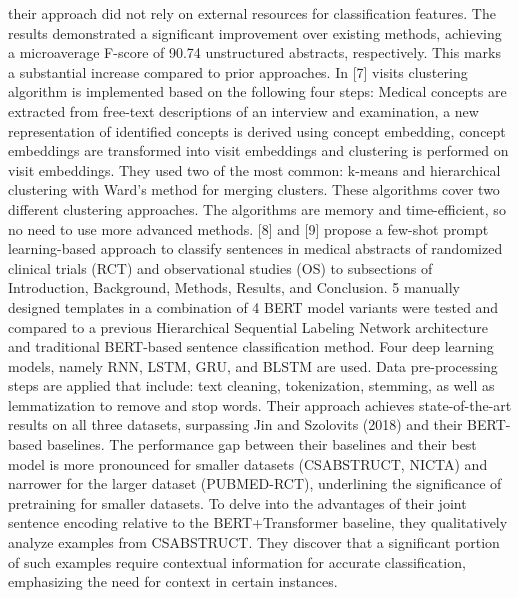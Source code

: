 \documentclass[conference]{IEEEtran}
\begin{document}
their approach did not rely on external resources
for classification features. The results demonstrated a significant
improvement over existing methods, achieving a microaverage
F-score of 90.74%
unstructured abstracts, respectively. This marks a substantial
increase compared to prior approaches.
In [7] visits clustering algorithm is implemented based on
the following four steps: Medical concepts are extracted from
free-text descriptions of an interview and examination, a new
representation of identified concepts is derived using concept
embedding, concept embeddings are transformed into visit
embeddings and clustering is performed on visit embeddings.
They used two of the most common: k-means and hierarchical
clustering with Ward’s method for merging clusters. These
algorithms cover two different clustering approaches. The
algorithms are memory and time-efficient, so no need to use
more advanced methods.
[8] and [9] propose a few-shot prompt learning-based approach
to classify sentences in medical abstracts of randomized
clinical trials (RCT) and observational studies (OS) to
subsections of Introduction, Background, Methods, Results,
and Conclusion. 5 manually designed templates in a combination
of 4 BERT model variants were tested and compared
to a previous Hierarchical Sequential Labeling Network architecture
and traditional BERT-based sentence classification
method. Four deep learning models, namely RNN, LSTM,
GRU, and BLSTM are used. Data pre-processing steps are
applied that include: text cleaning, tokenization, stemming,
as well as lemmatization to remove and stop words. Their
approach achieves state-of-the-art results on all three datasets,
surpassing Jin and Szolovits (2018) and their BERT-based
baselines. The performance gap between their baselines and
their best model is more pronounced for smaller datasets
(CSABSTRUCT, NICTA) and narrower for the larger dataset
(PUBMED-RCT), underlining the significance of pretraining
for smaller datasets. To delve into the advantages of their joint
sentence encoding relative to the BERT+Transformer baseline,
they qualitatively analyze examples from CSABSTRUCT.
They discover that a significant portion of such examples
require contextual information for accurate classification, emphasizing
the need for context in certain instances.
\end{document}
